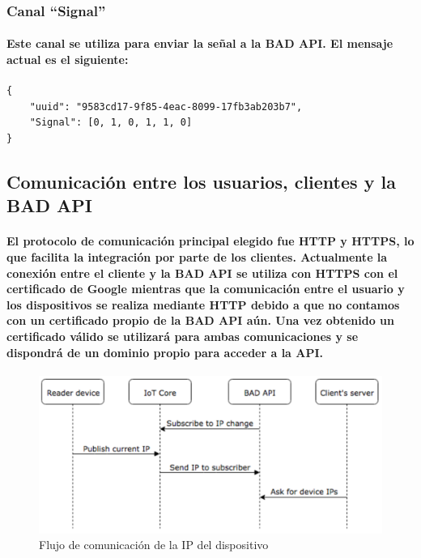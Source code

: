 \documentclass{article}
\begin{document}
\subsubsection{Canal “Signal”}
\paragraph{
Este canal se utiliza para enviar la señal a la BAD API. El mensaje actual es el siguiente:
}
\begin{verbatim}
{
    "uuid": "9583cd17-9f85-4eac-8099-17fb3ab203b7",
    "Signal": [0, 1, 0, 1, 1, 0]
}
\end{verbatim}

\subsection{Comunicación entre los usuarios, clientes y la BAD API}
\paragraph{
El protocolo de comunicación principal elegido fue HTTP y HTTPS, lo que facilita la integración por parte de los clientes. Actualmente la conexión entre el cliente y la BAD API se utiliza con HTTPS con el certificado de Google mientras que la comunicación entre el usuario y los dispositivos se realiza mediante HTTP debido a que no contamos con un certificado propio de la BAD API aún. Una vez obtenido un certificado válido se utilizará para ambas comunicaciones y se dispondrá de un dominio propio para acceder a la API.
}

\begin{figure}[ht]
    \centering
    \includegraphics[width=\textwidth]{ipexchange.png}%
    \caption{Flujo de comunicación de la IP del dispositivo}
    \label{fig:ipexchange}
\end{figure}
\end{document}

